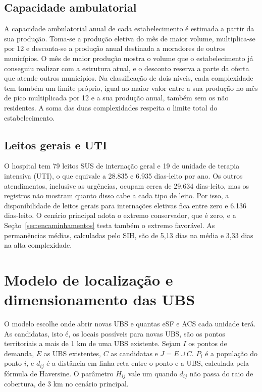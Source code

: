 \documentclass[12pt,a4paper,oneside]{report}
\begin{document}
\subsection{Capacidade ambulatorial}
A capacidade ambulatorial anual de cada estabelecimento é estimada a partir da sua produção. Toma-se a
produção eletiva do mês de maior volume, multiplica-se por 12 e desconta-se a produção anual destinada a
moradores de outros municípios. O mês de maior produção mostra o volume que o estabelecimento já
conseguiu realizar com a estrutura atual, e o desconto reserva a parte da oferta que atende outros
municípios. Na classificação de dois níveis, cada complexidade tem também um limite
próprio, igual ao maior valor entre a sua produção no mês de pico multiplicada por 12 e a sua produção
anual, também sem os não residentes. A soma das duas complexidades respeita o limite total do
estabelecimento.

\subsection{Leitos gerais e UTI}\label{sec:leitos}
O hospital tem 79 leitos SUS de internação geral e 19 de unidade de terapia intensiva (UTI), o que
equivale a 28.835 e 6.935 dias-leito por ano. Os outros atendimentos, inclusive as urgências, ocupam
cerca de 29.634 dias-leito, mas os registros não mostram quanto disso cabe a cada tipo de leito. Por
isso, a disponibilidade de leitos gerais para internações eletivas fica entre zero e 6.136 dias-leito.
O cenário principal adota o extremo conservador, que é zero, e a Seção~\ref{sec:encaminhamentos} testa
também o extremo favorável. As permanências médias, calculadas pelo SIH, são de 5,13 dias na média e
3,33 dias na alta complexidade.

\section{Modelo de localização e dimensionamento das UBS}\label{sec:modeloaps}
O modelo escolhe onde abrir novas UBS e quantas eSF e ACS cada unidade terá. As candidatas, isto é, os
locais possíveis para novas UBS, são os pontos territoriais a mais de 1 km de uma UBS existente. Sejam
$I$ os pontos de demanda, $E$ as UBS existentes, $C$ as candidatas e $J=E\cup C$. $P_i$ é a população do
ponto $i$, e $d_{ij}$ é a distância em linha reta entre o ponto e a UBS, calculada pela fórmula de
Haversine. O parâmetro $H_{ij}$ vale um quando $d_{ij}$ não passa do raio de cobertura, de 3 km no cenário principal.
\end{document}
